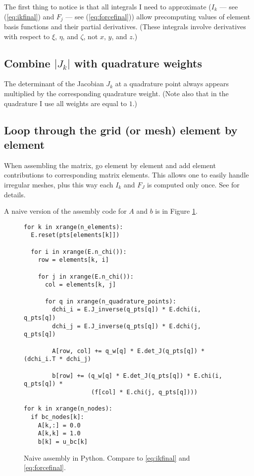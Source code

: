 \documentclass{article}
\begin{document}
The first thing to notice is that all integrals I need to approximate ($I_k$
--- see (\ref{eq:ikfinal}) and $F_j$ --- see (\ref{eq:forcefinal})) allow
precomputing values of element basis functions and their partial derivatives.
(These integrals involve derivatives with respect to $\xi$, $\eta$, and
$\zeta$, not $x$, $y$, and $z$.)

\subsection{Combine $| J_k |$ with quadrature weights}

The determinant of the Jacobian $J_k$ at a quadrature point always appears
multiplied by the corresponding quadrature weight. (Note also that in the
quadrature I use all weights are equal to $1$.)

\subsection{Loop through the grid (or mesh) element by element}

When assembling the matrix, go element by element and add element
contributions to corresponding matrix elements. This allows one to easily
handle irregular meshes, plus this way each $I_k$ and $F_J$ is computed only
once. See \cite[section 1.4.3]{Elmanetal2005} for details.

A naive version of the assembly code for $A$ and $b$ is in Figure \ref{fig:pythonnaive}.
\begin{figure}
  \centering
  \begin{lstlisting}
for k in xrange(n_elements):
  E.reset(pts[elements[k]])

  for i in xrange(E.n_chi()):
    row = elements[k, i]

    for j in xrange(E.n_chi()):
      col = elements[k, j]

      for q in xrange(n_quadrature_points):
        dchi_i = E.J_inverse(q_pts[q]) * E.dchi(i, q_pts[q])
        dchi_j = E.J_inverse(q_pts[q]) * E.dchi(j, q_pts[q])

        A[row, col] += q_w[q] * E.det_J(q_pts[q]) * (dchi_i.T * dchi_j)

        b[row] += (q_w[q] * E.det_J(q_pts[q]) * E.chi(i, q_pts[q]) *
                   (f[col] * E.chi(j, q_pts[q])))

for k in xrange(n_nodes):
  if bc_nodes[k]:
    A[k,:] = 0.0
    A[k,k] = 1.0
    b[k] = u_bc[k]
  \end{lstlisting}
  \caption{Naive assembly in Python. Compare to \eqref{eq:ikfinal} and \eqref{eq:forcefinal}.}
\label{fig:pythonnaive}
\end{figure}
\end{document}

